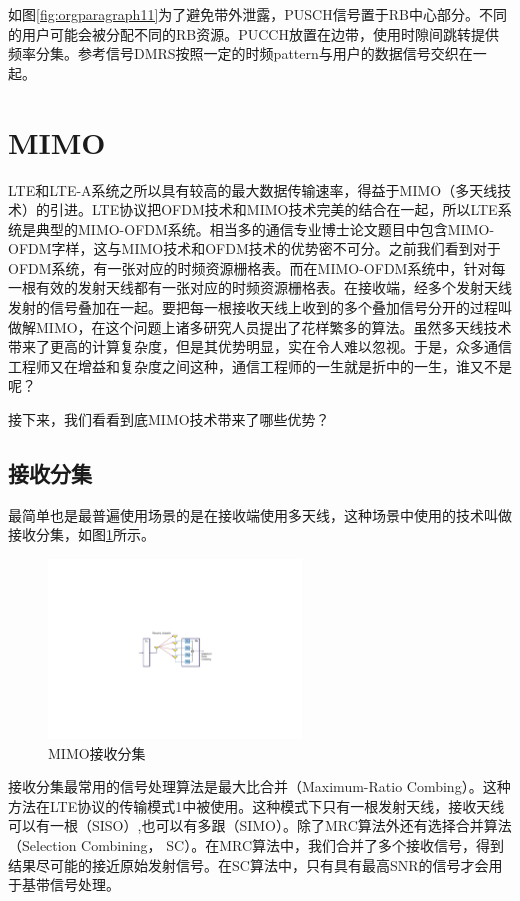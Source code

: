 \documentclass[10pt,a4paper,UTF8]{article}
\begin{document}
如图\ref{fig:orgparagraph11}为了避免带外泄露，PUSCH信号置于RB中心部分。不同的用户可能会被分配不同的RB资源。PUCCH放置在边带，使用时隙间跳转提供频率分集。参考信号DMRS按照一定的时频pattern与用户的数据信号交织在一起。

\section{MIMO}
\label{sec:orgheadline32}


LTE和LTE-A系统之所以具有较高的最大数据传输速率，得益于MIMO（多天线技术）的引进。LTE协议把OFDM技术和MIMO技术完美的结合在一起，所以LTE系统是典型的MIMO-OFDM系统。相当多的通信专业博士论文题目中包含MIMO-OFDM字样，这与MIMO技术和OFDM技术的优势密不可分。之前我们看到对于OFDM系统，有一张对应的时频资源栅格表。而在MIMO-OFDM系统中，针对每一根有效的发射天线都有一张对应的时频资源栅格表。在接收端，经多个发射天线发射的信号叠加在一起。要把每一根接收天线上收到的多个叠加信号分开的过程叫做解MIMO，在这个问题上诸多研究人员提出了花样繁多的算法。虽然多天线技术带来了更高的计算复杂度，但是其优势明显，实在令人难以忽视。于是，众多通信工程师又在增益和复杂度之间这种，通信工程师的一生就是折中的一生，谁又不是呢？

接下来，我们看看到底MIMO技术带来了哪些优势？
\subsection{接收分集}
\label{sec:orgheadline27}


最简单也是最普遍使用场景的是在接收端使用多天线，这种场景中使用的技术叫做接收分集，如图\ref{fig:orgparagraph12}所示。
\begin{figure}[htb]
\centering
\includegraphics[width=0.6\textwidth]{../../img/20151105ltereceivediversity.pdf}
\caption{\label{fig:orgparagraph12}
MIMO接收分集}
\end{figure}

接收分集最常用的信号处理算法是最大比合并（Maximum-Ratio Combing）。这种方法在LTE协议的传输模式1中被使用。这种模式下只有一根发射天线，接收天线可以有一根（SISO）,也可以有多跟（SIMO）。除了MRC算法外还有选择合并算法（Selection Combining， SC）。在MRC算法中，我们合并了多个接收信号，得到结果尽可能的接近原始发射信号。在SC算法中，只有具有最高SNR的信号才会用于基带信号处理。
\end{document}
